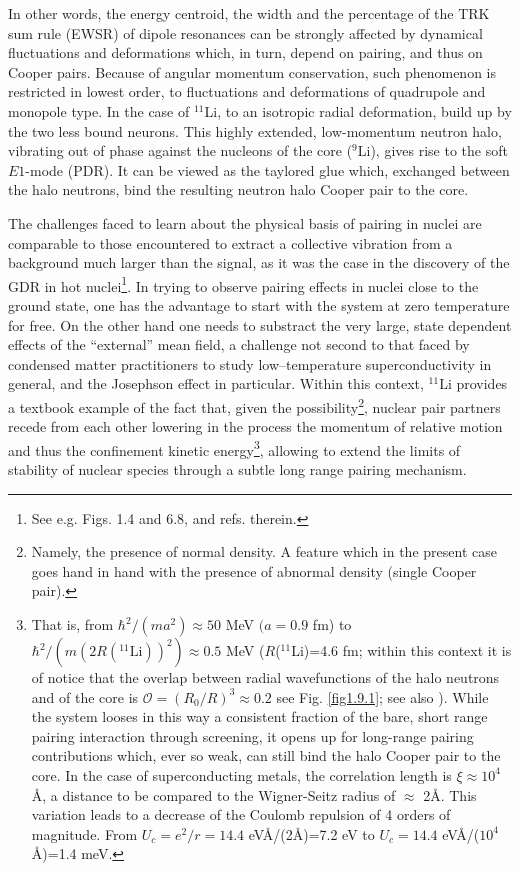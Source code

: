  In other words, the energy centroid, the width and the percentage of the TRK sum rule (EWSR) of dipole resonances can be strongly affected by dynamical fluctuations and deformations which, in turn, depend on pairing, and thus on Cooper pairs. Because of angular momentum conservation, such phenomenon is restricted in lowest order, to fluctuations and deformations of quadrupole and monopole type. In the case of $^{11}$Li, to an isotropic radial deformation, build up by the two less bound neurons. This highly extended, low-momentum neutron halo, vibrating out of phase against the nucleons of the core ($^9$Li), gives rise to the soft $E1$-mode (PDR).  It can be viewed as the taylored glue which, exchanged between the halo neutrons, bind the resulting neutron halo Cooper pair to the core.


The challenges faced to learn about the physical basis of pairing in nuclei are comparable to those encountered to extract a   collective vibration from a background much larger than the signal, as it was the case  in the discovery of the GDR in hot nuclei\footnote{See e.g. \cite{Bortignon:98} Figs. 1.4 and 6.8, and refs. therein.}. In trying to observe  pairing effects in nuclei close to the ground state, one has the advantage to start with the system at zero temperature for free. On the other hand one needs to substract the very large, state dependent effects of the ``external'' mean field, a challenge not second to that faced by condensed matter practitioners to study low--temperature superconductivity in general, and the Josephson effect in particular.  Within this context, $^{11}$Li provides a textbook example of the fact that, given the possibility\footnote{Namely, the presence of normal density. A feature which in the present case goes hand in hand with the presence of abnormal density (single Cooper pair).}, nuclear pair partners recede from each other lowering in the process the momentum of relative motion and thus the confinement kinetic energy\footnote{That is, from $\hbar^2/(ma^2)\approx 50$ MeV $(a=0.9$ fm) to $\hbar^2/(m(2R(^{11}\text{Li}))^2)\approx 0.5$ MeV ($R$($^{11}$Li)=4.6 fm; within this context it is of notice that the overlap between radial wavefunctions of the halo neutrons and of the core is $\mathcal O=(R_0/R)^3\approx0.2$  see Fig. \ref{fig1.9.1}; see also \cite{Broglia:19b}). While the system looses in this way a consistent fraction of the bare, short range pairing interaction through screening, it opens up for long-range pairing contributions which, ever so weak, can still bind the halo Cooper pair to the core. In the case of superconducting metals, the correlation length is $\xi\approx 10^4$ \AA, a distance to be compared to the Wigner-Seitz radius of $\approx$ 2\AA. This variation leads to a decrease of the Coulomb repulsion of 4 orders of magnitude. From $U_c=e^2/r=14.4$ eV\AA/(2\AA)=7.2 eV to $U_c=14.4$ eV\AA/($10^4$\AA)=1.4 meV.}, allowing to extend the limits of stability of nuclear species through a subtle long range pairing mechanism. 


